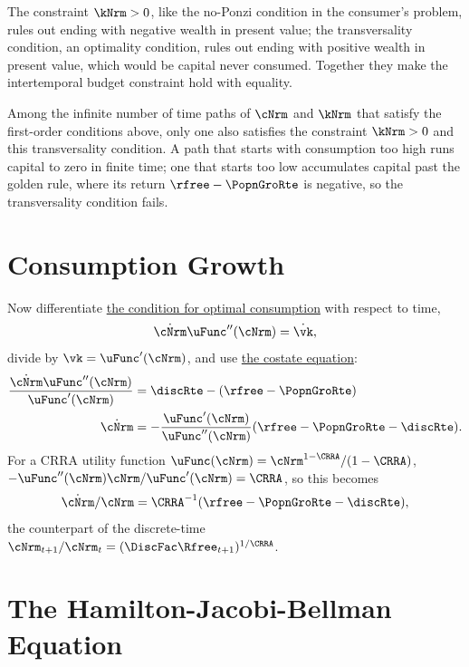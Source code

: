 \documentclass{econark}
\begin{document}
The constraint $\kNrm > 0$, like the no-Ponzi condition in the consumer's problem, rules out ending with negative wealth in present value; the transversality condition, an optimality condition, rules out ending with positive wealth in present value, which would be capital never consumed. Together they make the intertemporal budget constraint hold with equality.

Among the infinite number of time paths of $\cNrm$ and $\kNrm$ that
satisfy the first-order conditions above, only one also satisfies the
constraint $\kNrm > 0$ and this transversality condition. A path that starts
with consumption too high runs capital to zero in finite time; one that starts
too low accumulates capital past the golden rule, where its return
$\rfree-\PopnGroRte$ is negative, so the transversality condition fails.

\section{Consumption Growth}

Now differentiate \hyperref[eq:uceqvk]{the condition for optimal consumption} with respect to time,
\begin{equation*}
  \dot{\cNrm} \uFunc^{\prime\prime}(\cNrm) =  \dot{\vk} ,
\end{equation*}
divide by $\vk = \uFunc^{\prime}(\cNrm)$, and use \hyperref[eq:lamgrow]{the costate equation}:
\begin{equation}\begin{gathered}\begin{aligned}
        \frac{\dot{\cNrm} \uFunc^{\prime\prime}(\cNrm)}{\uFunc^{\prime}(\cNrm)} & =  \discRte-(\rfree-\PopnGroRte)  \\
        \dot{\cNrm} & =  -\frac{\uFunc^{\prime}(\cNrm)}{\uFunc^{\prime\prime}(\cNrm)} (\rfree-\PopnGroRte-\discRte) . \label{eq:HVD-cdot}
\end{aligned}\end{gathered}\end{equation}
For a CRRA utility function $\uFunc(\cNrm)=\cNrm^{1-\CRRA}/(1-\CRRA)$, $-\uFunc^{\prime\prime}(\cNrm) \cNrm/\uFunc^{\prime}(\cNrm) = \CRRA$, so this becomes
\begin{equation}
  \dot{\cNrm}/\cNrm = \CRRA^{-1}(\rfree-\PopnGroRte-\discRte) , \label{eq:HVD-cgrow}
\end{equation}
the counterpart of the discrete-time $\cNrm_{t+1}/\cNrm_{t} = (\DiscFac\Rfree_{t+1})^{1/\CRRA}$.

\section{The Hamilton-Jacobi-Bellman Equation}
\end{document}

